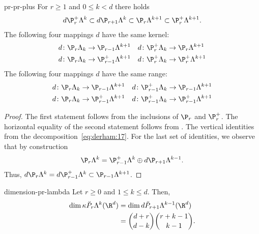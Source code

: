 \begin{Lemma}{pr-pr-plus}
  For $r\ge 1$ and $0\le k < d$ there holds
  \begin{gather}
    d\P_{r}^+\Lambda^k \subset d\P_{r+1}\Lambda^k
    \subset \P_r\Lambda^{k+1}
    \subset \P_r^+\Lambda^{k+1}.
  \end{gather}
  The following four mappings $d$ have the same kernel:
  \begin{gather}
    \begin{aligned}
      d\colon \P_r\Lambda_k &\to \P_{r-1}\Lambda^{k+1}
      &
      d\colon \P_r^+\Lambda_k &\to \P_{r}\Lambda^{k+1}
      \\
      d\colon \P_r\Lambda_k &\to \P_{r-1}^+\Lambda^{k+1}
      &
      d\colon \P_r^+\Lambda_k &\to \P_{r}^+\Lambda^{k+1}
    \end{aligned}
  \end{gather}
  The following four mappings $d$ have the same range:
  \begin{gather}
    \begin{aligned}
      d\colon \P_r\Lambda_k &\to \P_{r-1}\Lambda^{k+1}
      &
      d\colon \P_{r-1}^+\Lambda_k &\to \P_{r-1}\Lambda^{k+1}
      \\
      d\colon \P_r\Lambda_k &\to \P_{r-1}^+\Lambda^{k+1}
      &
      d\colon \P_{r-1}^+\Lambda_k &\to \P_{r-1}^+\Lambda^{k+1}
    \end{aligned}
  \end{gather}
\end{Lemma}

\begin{proof}
  The first statement follows from the inclusions of $\P_r$ and
  $\P_r^+$. The horizontal equality of the second statement follows
  from . The vertical identities from the
  decomposition~\eqref{eq:derham:17}. For the last set of identities,
  we observe that by construction
  \begin{gather}
    \P_r\Lambda^k = \P_{r-1}^+\Lambda^k \oplus d \P_{r+1}\Lambda^{k-1}.
  \end{gather}
  Thus, $d\P_r\Lambda^k = d\P_{r-1}^+\Lambda^k\subset \P_{r-1}\Lambda^{k+1}$.
\end{proof}

\begin{Theorem}{dimension-pr-lambda}
  Let $r\ge 0$ and $1\le k \le d$. Then,
  \begin{gather}
    \begin{split}
      \dim \kappa \breve P_r\Lambda^k(\R^d)
      & = \dim d \breve P_{r+1}\Lambda^{k-1}(\R^d)
      \\
      &= \binom{d+r}{d-k}\binom{r+k-1}{k-1}.
    \end{split}
  \end{gather}
\end{Theorem}

